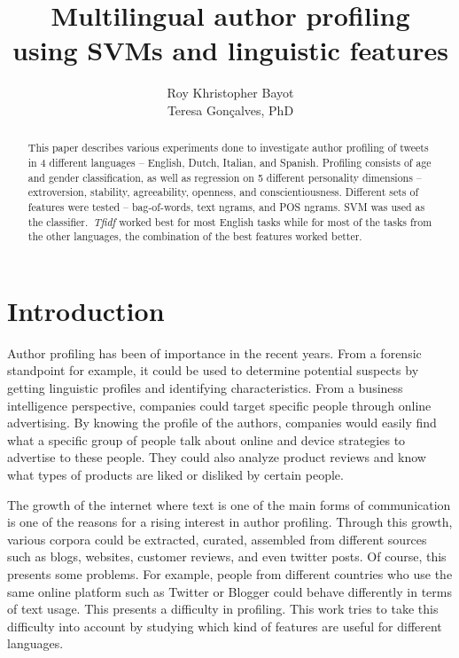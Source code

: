 \documentclass[a4paper]{llncs}
\begin{document}
\title{Multilingual author profiling \\using SVMs and linguistic features}
\titlerunning{}
\author{Roy Khristopher Bayot\\Teresa Gonçalves, PhD}

\maketitle
\begin{abstract}
This paper describes various experiments done to investigate author profiling of tweets in 4 different languages – English, Dutch, Italian, and Spanish. Profiling consists of age and gender classification, as well as regression on 5 different personality dimensions – extroversion, stability, agreeability, openness, and conscientiousness. Different sets of features were tested – bag-of-words, text ngrams, and POS ngrams. SVM was used as the classifier.~\textit{Tfidf} worked best for most English tasks while for most of the tasks from the other languages, the combination of the best features worked better. 
\end{abstract}

\section{Introduction}
Author profiling has been of importance in the recent years. From a forensic standpoint for example, it could be used to determine potential suspects by getting linguistic profiles and identifying characteristics. From a business intelligence perspective, companies could target specific people through online advertising. By knowing the profile of the authors, companies would easily find what a specific group of people talk about online and device strategies to advertise to these people. They could also analyze product reviews and know what types of products are liked or disliked by certain people. 

The growth of the internet where text is one of the main forms of communication is one of the reasons for a rising interest in author profiling. Through this growth, various corpora could be extracted, curated, assembled from different sources such as blogs, websites, customer reviews, and even twitter posts. Of course, this presents some problems. For example, people from different countries who use the same online platform such as Twitter or Blogger could behave differently in terms of text usage. This presents a difficulty in profiling. This work tries to take this difficulty into account by studying which kind of features are useful for different languages. 
\end{document}
